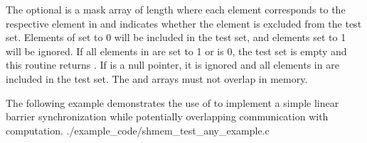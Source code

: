 \begin{apidefinition}
{    The optional  is a mask array of length  where each element
    corresponds to the respective element in  and indicates whether
    the element is excluded from the test set.  Elements of
     set to 0 will be included in the test set, and elements set to 1 will be ignored.  If all
    elements in  are set to 1 or  is 0, the test set is
    empty and this routine returns .  If  is a
    null pointer, it is ignored and all
    elements in  are included in the test set.  The  and
     arrays must not overlap in memory.
}



\begin{apiexamples}
  \apicexample
      {The following \Cstd[11] example demonstrates the use of
       to implement a simple linear barrier
      synchronization while potentially overlapping communication with
      computation.}
      {./example_code/shmem_test_any_example.c}
      {}
\end{apiexamples}

\end{apidefinition}
